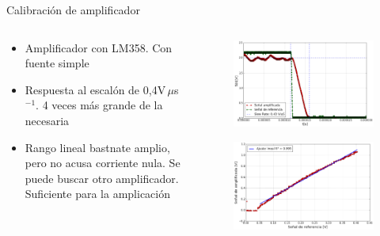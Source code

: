 \begin{frame}{Calibración de amplificador}

\begin{columns}[c]
    \begin{column}{0.4\textwidth}
        \begin{itemize}
        \item Amplificador con LM358. Con fuente simple
        \item Respuesta al escalón de 0,4V$\,\mu$s$^{-1}$. 4 veces más grande de la necesaria
        \item Rango lineal bastnate amplio, pero no acusa corriente nula. Se puede buscar otro amplificador. Suficiente para la amplicación
        \end{itemize}
    \end{column}
    \begin{column}{0.5\textwidth}
        \vspace{-1em}
        \begin{figure}[H]
            \centering
            \includegraphics[width=\textwidth]{fig/circuito/amp/transicion_amp}
            \label{fig:transicion_amp}
        \end{figure}
        \vspace{-2em}
        \begin{figure}[H]
            \centering
            \includegraphics[width=\textwidth]{fig/circuito/amp/lin_amp}
            \label{fig:circuito/amp/lin_amp}
        \end{figure}
    \end{column}
\end{columns}



\end{frame}
